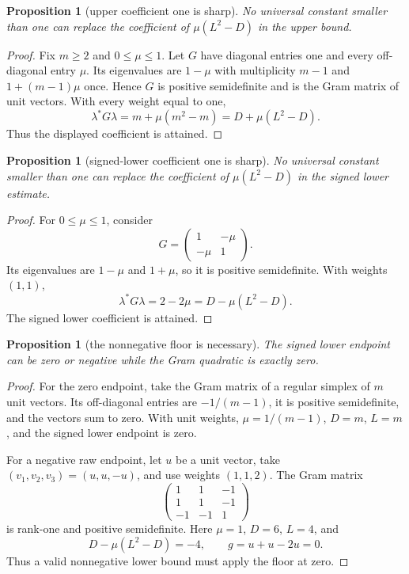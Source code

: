 \documentclass[11pt]{article}
\newtheorem{proposition}[theorem]{Proposition}
\theoremstyle{remark}
\begin{document}
\begin{proposition}[upper coefficient one is sharp]\label{prop:upper}
No universal constant smaller than one can replace the coefficient of
$\mu(L^2-D)$ in the upper bound.
\end{proposition}

\begin{proof}
Fix $m\geq2$ and $0\leq\mu\leq1$.  Let $G$ have diagonal entries one and every
off-diagonal entry $\mu$.  Its eigenvalues are $1-\mu$ with multiplicity
$m-1$ and $1+(m-1)\mu$ once.  Hence $G$ is positive semidefinite and is the
Gram matrix of unit vectors.  With every weight equal to one,
\[
 \lambda^*G\lambda=m+\mu(m^2-m)=D+\mu(L^2-D).
\]
Thus the displayed coefficient is attained.
\end{proof}

\begin{proposition}[signed-lower coefficient one is sharp]\label{prop:lower}
No universal constant smaller than one can replace the coefficient of
$\mu(L^2-D)$ in the signed lower estimate.
\end{proposition}

\begin{proof}
For $0\leq\mu\leq1$, consider
\[
 G=\begin{pmatrix}1&-\mu\\-\mu&1\end{pmatrix}.
\]
Its eigenvalues are $1-\mu$ and $1+\mu$, so it is positive semidefinite.  With
weights $(1,1)$,
\[
 \lambda^*G\lambda=2-2\mu=D-\mu(L^2-D).
\]
The signed lower coefficient is attained.
\end{proof}

\begin{proposition}[the nonnegative floor is necessary]\label{prop:floor}
The signed lower endpoint can be zero or negative while the Gram quadratic is
exactly zero.
\end{proposition}

\begin{proof}
For the zero endpoint, take the Gram matrix of a regular simplex of $m$ unit
vectors.  Its off-diagonal entries are $-1/(m-1)$, it is positive
semidefinite, and the vectors sum to zero.  With unit weights,
$\mu=1/(m-1)$, $D=m$, $L=m$, and the signed lower endpoint is zero.

For a negative raw endpoint, let $u$ be a unit vector, take
$(v_1,v_2,v_3)=(u,u,-u)$, and use weights $(1,1,2)$.  The Gram matrix
\[
 \begin{pmatrix}1&1&-1\\1&1&-1\\-1&-1&1\end{pmatrix}
\]
is rank-one and positive semidefinite.  Here $\mu=1$, $D=6$, $L=4$, and
\[
 D-\mu(L^2-D)=-4,\qquad
 g=u+u-2u=0.
\]
Thus a valid nonnegative lower bound must apply the floor at zero.
\end{proof}
\end{document}
